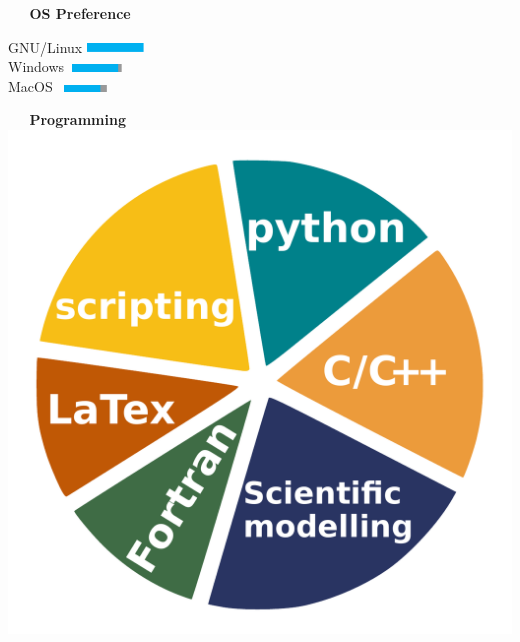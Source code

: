 \documentclass[12pt]{extarticle}
\begin{document}
\begin{minipage}{0.32\columnwidth}
\begin{flushright}
  \textcolor{azul}{\bf\large \textbullet~~ OS Preference}\\ \vspace*{3mm}

    {GNU/Linux }\includegraphics[width=1.5cm,height=0.27cm]{img/5stars.pdf}\\ %
    {Windows }\includegraphics[width=1.5cm,height=0.22cm]{img/4-8stars.pdf}\\ %
    {MacOS }\includegraphics[width=1.5cm,height=0.19cm]{img/4stars.pdf}\\
    \vspace*{4mm}

   \textcolor{azul}{\bf\large \textbullet~~ Programming}\\ %
   \includegraphics[scale=0.3]{img/programming1.pdf}\\

 \end{flushright}
\end{minipage}
\end{document}
